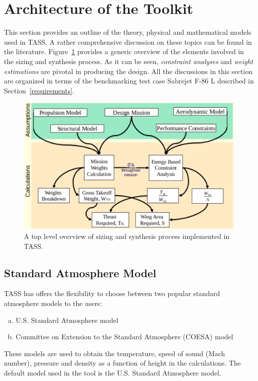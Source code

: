 \documentclass[pdftex,11pt,letter]{article}
\begin{document}
\section{Architecture of the Toolkit}\label{theory}
This section provides an outline of the theory, physical and mathematical models used in TASS. A rather comprehensive discussion on these topics can be found in the literature\cite{MattinglyText,NicolaiText,FieldingText,HoweText,RaymerText}. Figure~\ref{fig:sizing_overview} provides a generic overview of the elements involved in the sizing and synthesis process. As it can be seen, \emph{constraint analyses} and \emph{weight estimations} are pivotal in producing the design.  All the discussions in this section are organized in terms of the benchmarking test case Sabrejet F-86 L described in Section~\ref{requirements}.

\begin{figure}[h!]
	\centering
	\includegraphics[scale=0.85]{figures/sizing_overview.pdf}
	\caption{A top level overview of sizing and synthesis process implemented in TASS\cite{MavrisNotes}.}
	\label{fig:sizing_overview}
\end{figure}

\subsection{Standard Atmosphere Model}
TASS has offers the flexibility to choose between two popular standard atmosphere models to the users:
\begin{enumerate}[(a)]
\item U.S. Standard Atmosphere model\cite{US}
\item  Committee on Extension to the Standard Atmosphere (COESA) model\cite{US}
\end{enumerate}
These models are used to obtain the temperature, speed of sound (Mach number), pressure and density as a function of height in the calculations. The default model used in the tool is the U.S. Standard Atmosphere model.
\end{document}
